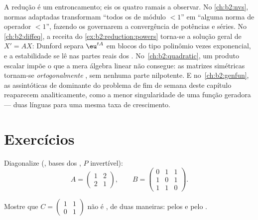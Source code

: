 \begin{remark}\label{rem:b2:reduction:perspectives}
A redução é um entroncamento; eis os quatro ramais a observar. No
\cref{ch:b2:nvs}, normas adaptadas transformam ``todos os  de
módulo $< 1$'' em ``alguma norma de operador $< 1$'', fazendo os
 governarem a convergência de potências e séries. No
\cref{ch:b2:diffeq}, a receita do
\cref{ex:b2:reduction:powers} torna-se a solução geral de
$X' = AX$: Dunford separa $\eu^{tA}$ em blocos do tipo
polinômio vezes exponencial, e a estabilidade se lê nas
partes reais dos . No~\cref{ch:b2:quadratic}, um
produto escalar impõe o que a mera álgebra linear não consegue: as matrizes
simétricas tornam-se \emph{ortogonalmente} , sem
nenhuma parte nilpotente. E no~\cref{ch:b2:genfun}, as
assintóticas de  dominante do problema de fim de semana
deste capítulo reaparecem analiticamente, como a menor singularidade de uma
função geradora --- duas línguas para uma mesma taxa de crescimento.
\end{remark}

\section{Exercícios}

\begin{exercise}[$\star$]\label{exo:b2:reduction:1}
Diagonalize (, bases dos , $P$ invertível):
\[
A = \begin{pmatrix} 1 & 2\\ 2 & 1 \end{pmatrix},
\qquad
B = \begin{pmatrix} 0 & 1 & 1\\ 1 & 0 & 1\\ 1 & 1 & 0
\end{pmatrix}.
\]
\end{exercise}

\begin{exercise}[$\star$]\label{exo:b2:reduction:2}
Mostre que $C = \begin{pmatrix} 1 & 1\\ 0 & 1\end{pmatrix}$ não é
, de duas maneiras: pelos  e pelo .
\end{exercise}

